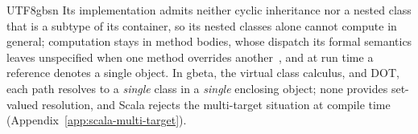 \begin{CJK*}{UTF8}{gbsn}
Its implementation admits neither cyclic inheritance nor a nested class that is a subtype of its
container, so its nested classes alone cannot compute in general; computation stays in method bodies, whose dispatch its formal semantics leaves unspecified when one
method overrides another~\cite[Appendix~A]{nystrom2006-nested-intersection-report}, and at run time a
reference denotes a single object.
In gbeta, the virtual class calculus, and DOT, each path resolves to a
\emph{single} class in a \emph{single} enclosing object;
none provides set-valued resolution, and Scala rejects
the multi-target situation at compile time
(Appendix~\ref{app:scala-multi-target}).
\fi


\end{CJK*}
